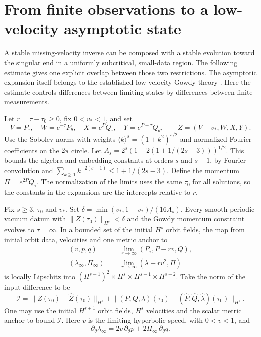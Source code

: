 \section{From finite observations to a low-velocity asymptotic state}
\label{sec:low-velocity-tail}

A stable missing-velocity inverse can be composed with
a stable evolution toward the singular end in a
uniformly subcritical, small-data region. The following
estimate gives one explicit overlap between those
two restrictions. The asymptotic expansion itself
belongs to the established low-velocity Gowdy
theory \cite{ringstrom,ringstromavtd,libounces}.
Here the estimate controls differences between
limiting states by differences between finite
measurements.

Let $r=\tau-\tau_0\ge0$, fix $0<v_*<1$, and set
\[
 V=P_\tau,\quad W=e^{-\tau}P_\theta,\quad
 X=e^P Q_\tau,\quad Y=e^{P-\tau}Q_\theta,\qquad
 Z=(V-v_*,W,X,Y).
\]
Use the Sobolev norms with weights
$\langle k\rangle^s=(1+k^2)^{s/2}$ and normalized
Fourier coefficients on the $2\pi$ circle.
Let $A_s=2^s(1+2(1+1/(2s-3)))^{1/2}$.
This bounds the algebra and embedding constants at
orders $s$ and $s-1$, by Fourier convolution and
$\sum_{k\ge1}k^{-2(s-1)}\le1+1/(2s-3)$.
Define the momentum $\Pi=e^{2P}Q_\tau$.
The normalization of the limits uses the same $\tau_0$
for all solutions, so the constants in the expansions
are the intercepts relative to $r$.

\begin{proposition}
\label{prop:low-velocity-difference}
Fix $s\ge3$, $\tau_0$ and $v_*$. Set
$\delta=\min(v_*,1-v_*)/(16A_s)$.
Every smooth periodic vacuum datum with
$\|Z(\tau_0)\|_{H^s}<\delta$ and the Gowdy momentum
constraint evolves to $\tau=\infty$. In a bounded
set of the initial $H^s$ orbit fields, the map from
initial orbit data, velocities and one metric anchor
to
\begin{align*}
 (v,p,q)&=\lim_{r\to\infty}(P_\tau,P-rv,Q),\\
 (\lambda_\infty,\Pi_\infty)&=
                 \lim_{r\to\infty}(\lambda-rv^2,\Pi)
\end{align*}
is locally Lipschitz into
$(H^{s-1})^2\times H^s\times H^{s-1}\times H^{s-2}$.
Take the norm of the input difference to be
\[
 \mathcal I=\|Z(\tau_0)-\widehat Z(\tau_0)\|_{H^s}
      +\|(P,Q,\lambda)(\tau_0)-
                   (\widehat P,\widehat Q,\widehat\lambda)(\tau_0)\|_{H^s}.
\]
One may use the initial $H^{s+1}$ orbit fields, $H^s$
velocities and the scalar metric anchor to bound
$\mathcal I$. Here $v$ is the limiting hyperbolic
speed, with $0<v<1$, and
\begin{equation}
 \partial_\theta\lambda_\infty
 =
 2v\,\partial_\theta p+2\Pi_\infty\,\partial_\theta q .
 \label{eq:tail-momentum}
\end{equation}
\end{proposition}

